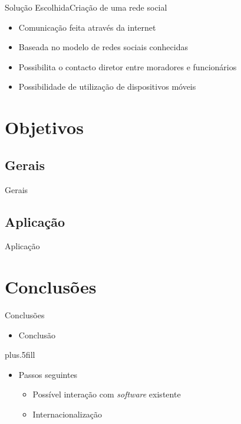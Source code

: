 \documentclass[portuges]{beamer}
\begin{document}
\begin{frame}{Solução Escolhida}{Criação de uma rede social}
  \begin{itemize}
  \item Comunicação feita através da internet
  \item Baseada no modelo de redes sociais conhecidas
  \item Possibilita o contacto diretor entre moradores e funcionários
  \item Possibilidade de utilização de dispositivos móveis
  \end{itemize}
\end{frame}

\section{Objetivos}

\subsection{Gerais}

\begin{frame}{Gerais}
\end{frame}

\subsection{Aplicação}

\begin{frame}{Aplicação}
\end{frame}



\section*{Conclusões}

\begin{frame}{Conclusões}

  \begin{itemize}
  \item Conclusão
  \end{itemize}
  
  \vskip0pt plus.5fill
  \begin{itemize}
  \item
    Passos seguintes
    \begin{itemize}
    \item
      Possível interação com \emph{software} existente 
    \item
      Internacionalização
    \end{itemize}
  \end{itemize}
\end{frame}
\end{document}
